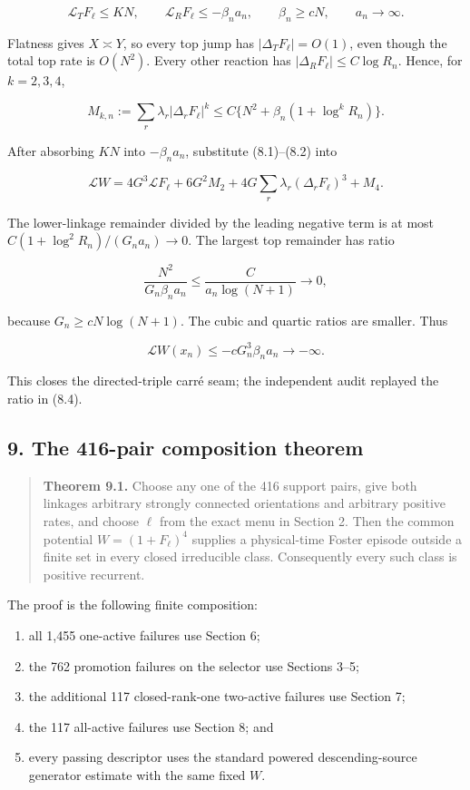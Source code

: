 \[
 \mathcal L_TF_\ell\le KN,
 \qquad
 \mathcal L_RF_\ell\le-\beta_na_n,
 \qquad
 \beta_n\ge cN,
 \qquad a_n\to\infty.                                \tag{8.1}
\]

Flatness gives \(X\asymp Y\), so every top jump has
\(|\Delta_TF_\ell|=O(1)\), even though the total top rate is \(O(N^2)\).
Every other reaction has \(|\Delta_RF_\ell|\le C\log R_n\). Hence, for
\(k=2,3,4\),

\[
 M_{k,n}:=\sum_r\lambda_r|\Delta_rF_\ell|^k
 \le C\{N^2+\beta_n(1+\log^kR_n)\}.                  \tag{8.2}
\]

After absorbing \(KN\) into \(-\beta_na_n\), substitute (8.1)--(8.2)
into

\[
 \mathcal LW
 =4G^3\mathcal LF_\ell+6G^2M_2
   +4G\sum_r\lambda_r(\Delta_rF_\ell)^3+M_4.         \tag{8.3}
\]

The lower-linkage remainder divided by the leading negative term is at
most \(C(1+\log^2R_n)/(G_na_n)\to0\). The largest top remainder has
ratio

\[
 \frac{N^2}{G_n\beta_na_n}
 \le\frac{C}{a_n\log(N+1)}\longrightarrow0,          \tag{8.4}
\]

because \(G_n\ge cN\log(N+1)\). The cubic and quartic ratios are
smaller. Thus

\[
 \mathcal LW(x_n)\le-cG_n^3\beta_na_n\to-\infty.    \tag{8.5}
\]

This closes the directed-triple carré seam; the independent audit
replayed the ratio in (8.4).

\subsection{9. The 416-pair composition
theorem}

\begin{quote}
\textbf{Theorem 9.1.} Choose any one of the 416 support pairs, give both
linkages arbitrary strongly connected orientations and arbitrary
positive rates, and choose \(\ell\) from the exact menu in Section 2.
Then the common potential \(W=(1+F_\ell)^4\) supplies a physical-time
Foster episode outside a finite set in every closed irreducible class.
Consequently every such class is positive recurrent.
\end{quote}

The proof is the following finite composition:

\begin{enumerate}
\def\labelenumi{\arabic{enumi}.}
\tightlist
\item
  all 1,455 one-active failures use Section 6;
\item
  the 762 promotion failures on the selector use Sections 3--5;
\item
  the additional 117 closed-rank-one two-active failures use Section 7;
\item
  the 117 all-active failures use Section 8; and
\item
  every passing descriptor uses the standard powered descending-source
  generator estimate with the same fixed \(W\).
\end{enumerate}


